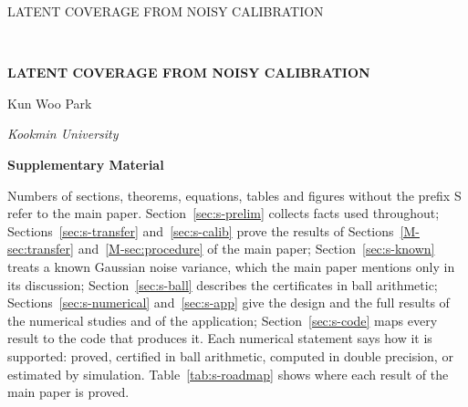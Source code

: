 \documentclass[12pt]{article}
\renewcommand{\_}{\usc\allowbreak}
\theoremstyle{definition}
\numberwithin{equation}{section}
\begin{document}
\renewcommand{\baselinestretch}{2}


{\hfill {\footnotesize\rm LATENT COVERAGE FROM NOISY CALIBRATION} \hfill}

\renewcommand{\thefootnote}{}
$\ $\par

\fontsize{12}{14pt plus.8pt minus .6pt}\selectfont
\vspace{0.8pc}
\centerline{\large\bf LATENT COVERAGE FROM NOISY CALIBRATION}
\vspace{.4cm}
\centerline{Kun Woo Park}
\vspace{.4cm}
\centerline{\it Kookmin University}
\vspace{.55cm}
\centerline{\bf Supplementary Material}
\vspace{.55cm}
\fontsize{9}{11.5pt plus.8pt minus .6pt}\selectfont
\noindent
Numbers of sections, theorems, equations, tables and figures without the prefix S refer to the main paper. Section~\ref{sec:s-prelim} collects facts used throughout; Sections~\ref{sec:s-transfer} and~\ref{sec:s-calib} prove the results of Sections~\ref{M-sec:transfer} and~\ref{M-sec:procedure} of the main paper; Section~\ref{sec:s-known} treats a known Gaussian noise variance, which the main paper mentions only in its discussion; Section~\ref{sec:s-ball} describes the certificates in ball arithmetic; Sections~\ref{sec:s-numerical} and~\ref{sec:s-app} give the design and the full results of the numerical studies and of the application; Section~\ref{sec:s-code} maps every result to the code that produces it. Each numerical statement says how it is supported: proved, certified in ball arithmetic, computed in double precision, or estimated by simulation. Table~\ref{tab:s-roadmap} shows where each result of the main paper is proved.
\par

\fontsize{12}{14pt plus.8pt minus .6pt}\selectfont
\end{document}
